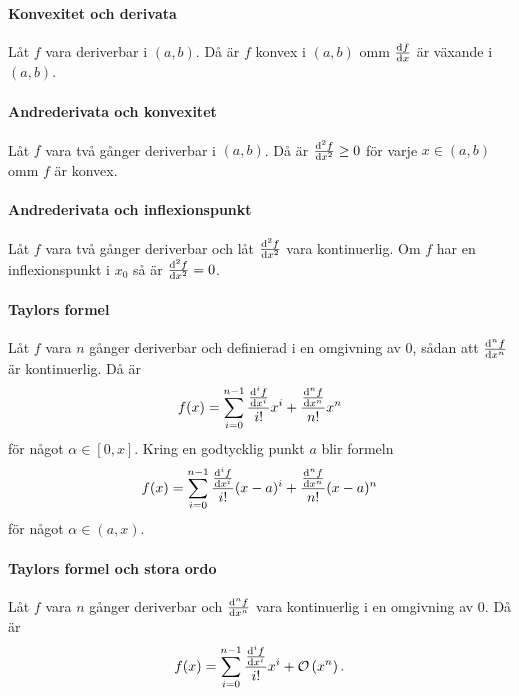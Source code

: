 \proof

\paragraph{Konvexitet och derivata}
Låt $f$ vara deriverbar i $(a, b)$. Då är $f$ konvex i $(a, b)$ omm $\dv{f}{x}$ är växande i $(a, b)$.

\proof

\paragraph{Andrederivata och konvexitet}
Låt $f$ vara två gånger deriverbar i $(a, b)$. Då är $\dv[2]{f}{x} (x)\geq 0$ för varje $x\in (a, b)$ omm $f$ är konvex.

\proof

\paragraph{Andrederivata och inflexionspunkt}
Låt $f$ vara två gånger deriverbar och låt $\dv[2]{f}{x}$ vara kontinuerlig. Om $f$ har en inflexionspunkt i $x_0$ så är $\dv[2]{f}{x} (x_0) = 0$.

\proof

\paragraph{Taylors formel}
Låt $f$ vara $n$ gånger deriverbar och definierad i en omgivning av $0$, sådan att $\dv[n]{f}{x}$ är kontinuerlig. Då är
\begin{align*}
	f(x) = \sum\limits_{i = 0}^{n - 1}\frac{\dv[i]{f}{x} (0)}{i!}x^i + \frac{\dv[n]{f}{x} (\alpha)}{n!}x^n
\end{align*}
för något $\alpha\in [0, x]$. Kring en godtycklig punkt $a$ blir formeln
\begin{align*}
	f(x) = \sum\limits_{i = 0}^{n - 1}\frac{\dv[i]{f}{x} (a)}{i!}(x - a)^i + \frac{\dv[n]{f}{x} (\alpha)}{n!}(x - a)^n
\end{align*}
för något $\alpha\in (a, x)$.

\proof

\paragraph{Taylors formel och stora ordo}
Låt $f$ vara $n$ gånger deriverbar och $\dv[n]{f}{x}$ vara kontinuerlig i en omgivning av $0$. Då är
\begin{align*}
	f(x) = \sum\limits_{i = 0}^{n - 1}\frac{\dv[i]{f}{x} (0)}{i!}x^i + \mathcal{O}\left(x^n\right).
\end{align*}

\proof